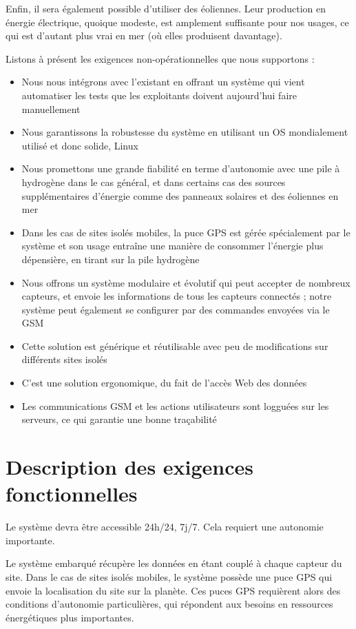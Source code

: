 Enfin, il sera également possible d’utiliser des éoliennes. Leur production en énergie électrique, quoique modeste, est amplement suffisante pour nos usages, ce qui est d’autant plus vrai en mer (où elles produisent davantage).

Listons à présent les exigences non-opérationnelles que nous supportons :

\begin{itemize}
\item Nous nous intégrons avec l’existant en offrant un système qui vient automatiser les tests que les exploitants doivent aujourd’hui faire manuellement
\item Nous garantissons la robustesse du système en utilisant un OS mondialement utilisé et donc solide, Linux
\item Nous promettons une grande fiabilité en terme d’autonomie avec une pile à hydrogène dans le cas général, et dans certains cas des sources supplémentaires d’énergie comme des panneaux solaires et des éoliennes en mer
\item Dans les cas de sites isolés mobiles, la puce GPS est gérée spécialement par le système et son usage entraîne une manière de consommer l’énergie plus dépensière, en tirant sur la pile hydrogène 
\item Nous offrons un système modulaire et évolutif qui peut accepter de nombreux capteurs, et envoie les informations de tous les capteurs connectés ; notre système peut également se configurer par des commandes envoyées via le GSM
\item Cette solution est générique et réutilisable avec peu de modifications sur différents sites isolés
\item C’est une solution ergonomique, du fait de l’accès Web des données
\item Les communications GSM et les actions utilisateurs sont logguées sur les serveurs, ce qui garantie une bonne traçabilité
\end{itemize}


\section{Description des exigences fonctionnelles}

Le système devra être accessible 24h/24, 7j/7. Cela requiert une autonomie importante.

Le système embarqué récupère les données en étant couplé à chaque capteur du site. Dans le cas de sites isolés mobiles, le système possède une puce GPS qui envoie la localisation du site sur la planète. Ces puces GPS requièrent alors des conditions d’autonomie particulières, qui répondent aux besoins en ressources énergétiques plus importantes.

